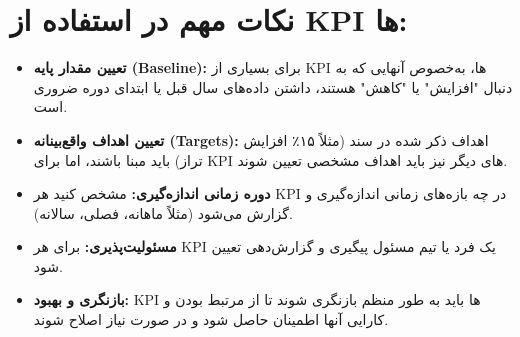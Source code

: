 \documentclass[12pt,a4paper]{article}
\begin{document}
\section*{نکات مهم در استفاده از KPI ها:}
\begin{itemize}[rightmargin=1em, leftmargin=*, itemsep=0.5ex]
    \item \textbf{تعیین مقدار پایه (Baseline):} برای بسیاری از KPI ها، به‌خصوص آنهایی که به دنبال "افزایش" یا "کاهش" هستند، داشتن داده‌های سال قبل یا ابتدای دوره ضروری است.
    \item \textbf{تعیین اهداف واقع‌بینانه (Targets):} اهداف ذکر شده در سند (مثلاً ۱۵٪ افزایش تراز) باید مبنا باشند، اما برای KPI های دیگر نیز باید اهداف مشخصی تعیین شوند.
    \item \textbf{دوره زمانی اندازه‌گیری:} مشخص کنید هر KPI در چه بازه‌های زمانی اندازه‌گیری و گزارش می‌شود (مثلاً ماهانه، فصلی، سالانه).
    \item \textbf{مسئولیت‌پذیری:} برای هر KPI یک فرد یا تیم مسئول پیگیری و گزارش‌دهی تعیین شود.
    \item \textbf{بازنگری و بهبود:} KPI ها باید به طور منظم بازنگری شوند تا از مرتبط بودن و کارایی آنها اطمینان حاصل شود و در صورت نیاز اصلاح شوند.
\end{itemize}
\end{document}

